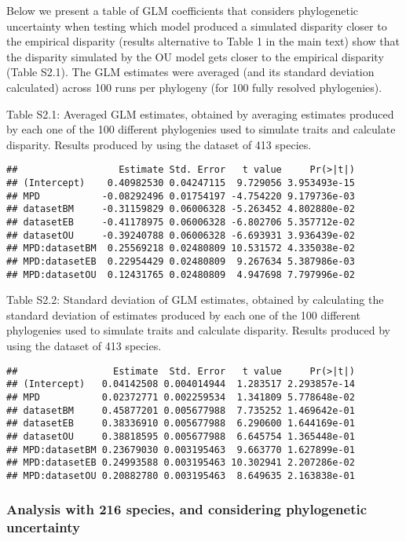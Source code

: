 \documentclass[
]{article}
\begin{document}
Below we present a table of GLM coefficients that considers phylogenetic
uncertainty when testing which model produced a simulated disparity
closer to the empirical disparity (results alternative to Table 1 in the
main text) show that the disparity simulated by the OU model gets closer
to the empirical disparity (Table S2.1). The GLM estimates were averaged
(and its standard deviation calculated) across 100 runs per phylogeny
(for 100 fully resolved phylogenies).

Table S2.1: Averaged GLM estimates, obtained by averaging estimates
produced by each one of the 100 different phylogenies used to simulate
traits and calculate disparity. Results produced by using the dataset of
413 species.

\begin{verbatim}
##                  Estimate Std. Error   t value     Pr(>|t|)
## (Intercept)    0.40982530 0.04247115  9.729056 3.953493e-15
## MPD           -0.08292496 0.01754197 -4.754220 9.179736e-03
## datasetBM     -0.31159829 0.06006328 -5.263452 4.802880e-02
## datasetEB     -0.41178975 0.06006328 -6.802706 5.357712e-02
## datasetOU     -0.39240788 0.06006328 -6.693931 3.936439e-02
## MPD:datasetBM  0.25569218 0.02480809 10.531572 4.335038e-02
## MPD:datasetEB  0.22954429 0.02480809  9.267634 5.387986e-03
## MPD:datasetOU  0.12431765 0.02480809  4.947698 7.797996e-02
\end{verbatim}

Table S2.2: Standard deviation of GLM estimates, obtained by calculating
the standard deviation of estimates produced by each one of the 100
different phylogenies used to simulate traits and calculate disparity.
Results produced by using the dataset of 413 species.

\begin{verbatim}
##                 Estimate  Std. Error   t value     Pr(>|t|)
## (Intercept)   0.04142508 0.004014944  1.283517 2.293857e-14
## MPD           0.02372771 0.002259534  1.341809 5.778648e-02
## datasetBM     0.45877201 0.005677988  7.735252 1.469642e-01
## datasetEB     0.38336910 0.005677988  6.290600 1.644169e-01
## datasetOU     0.38818595 0.005677988  6.645754 1.365448e-01
## MPD:datasetBM 0.23679030 0.003195463  9.663770 1.627899e-01
## MPD:datasetEB 0.24993588 0.003195463 10.302941 2.207286e-02
## MPD:datasetOU 0.20882780 0.003195463  8.649635 2.163838e-01
\end{verbatim}

\newpage

\hypertarget{analysis-with-216-species-and-considering-phylogenetic-uncertainty}{%
\subsubsection{Analysis with 216 species, and considering phylogenetic
uncertainty}\label{analysis-with-216-species-and-considering-phylogenetic-uncertainty}}
\end{document}
